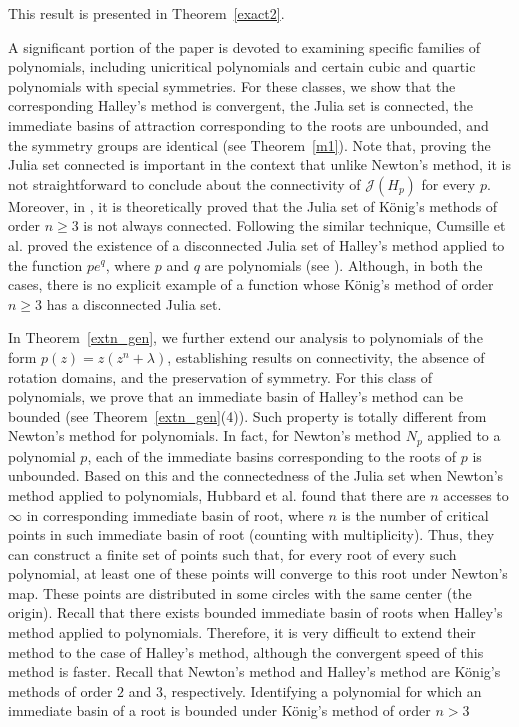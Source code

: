 \documentclass[12pt]{article}
\begin{document}
This result is presented in Theorem~\ref{exact2}.
\par
A significant portion of the paper is devoted to examining specific families of polynomials, including unicritical polynomials and certain cubic and quartic polynomials with special symmetries. For these classes, we show that the corresponding Halley’s method is convergent, the Julia set is connected, the immediate basins of attraction corresponding to the roots are unbounded, and the symmetry groups are identical (see Theorem~\ref{m1}). Note that, proving the Julia set connected is important in the context that unlike Newton's method, it is not straightforward to conclude about the connectivity of $\mathcal{J}(H_p)$ for every $p$. Moreover, in \cite{Honorato2013}, it is theoretically proved that the Julia set of K\"{o}nig's methods of order $n\geq 3$ is not always connected. Following the similar technique, Cumsille et al. proved the existence of a disconnected Julia set of Halley's method applied to the function $pe^q$, where $p$ and $q$ are polynomials (see \cite[Theorem 1.1]{CMHD2022}). Although, in both the cases, there is no explicit example of a function whose K\"{o}nig's method of order $n\geq 3$ has a disconnected Julia set.
\par
In Theorem~\ref{extn_gen}, we further extend our analysis to polynomials of the form $ p(z) = z(z^n + \lambda) $, establishing results on connectivity, the absence of rotation domains, and the preservation of symmetry. For this class of polynomials, we prove that an immediate basin of Halley's method can be bounded (see Theorem~\ref{extn_gen}(4)). Such property is totally different from Newton's method for polynomials. In fact, for Newton's method $N_p$ applied to a polynomial $p$, each of the immediate basins corresponding to the roots of $p$ is unbounded. Based on this and the connectedness of the Julia set when Newton's method applied to polynomials, Hubbard et al. \cite{HSS2001} found that there are  $ n $ accesses to $\infty$ in corresponding immediate basin of root, where $ n $ is the number of critical points in such immediate basin of root (counting with multiplicity). Thus, they can construct a finite set of points such that, for every root of every such polynomial, at least one of these points will converge to this root under Newton's map. These points are distributed in some circles with the same center (the origin). Recall that there exists bounded immediate basin of roots when Halley's method applied to polynomials. Therefore, it is very difficult to extend their method to the case of Halley's method, although the convergent speed of this method is faster. Recall that Newton's method and Halley's method are K\"{o}nig's methods of order $ 2 $ and $ 3 $, respectively. Identifying a polynomial for which an immediate basin of a root is bounded under K\"{o}nig's method of order $n>3$
\end{document}
